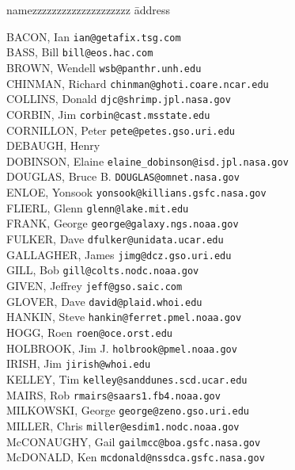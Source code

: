 \begin{latexonly}
\begin{tabbing}
namezzzzzzzzzzzzzzzzzzzz \= address \kill

BACON, Ian \> {\tt ian@getafix.tsg.com} \\
BASS, Bill \> {\tt bill@eos.hac.com} \\
BROWN, Wendell \> {\tt wsb@panthr.unh.edu} \\
CHINMAN, Richard \> {\tt chinman@ghoti.coare.ncar.edu} \\
COLLINS, Donald \> {\tt djc@shrimp.jpl.nasa.gov} \\
CORBIN, Jim \> {\tt corbin@cast.msstate.edu} \\
CORNILLON, Peter \> {\tt pete@petes.gso.uri.edu} \\
DEBAUGH, Henry \\
DOBINSON, Elaine \> {\tt elaine\_dobinson@isd.jpl.nasa.gov} \\
DOUGLAS, Bruce B.\> {\tt DOUGLAS@omnet.nasa.gov} \\
ENLOE, Yonsook \> {\tt yonsook@killians.gsfc.nasa.gov} \\
FLIERL, Glenn \> {\tt glenn@lake.mit.edu} \\
FRANK, George \> {\tt george@galaxy.ngs.noaa.gov} \\
FULKER, Dave \> {\tt dfulker@unidata.ucar.edu} \\
GALLAGHER, James \> {\tt jimg@dcz.gso.uri.edu} \\
GILL, Bob \> {\tt gill@colts.nodc.noaa.gov} \\
GIVEN, Jeffrey \> {\tt jeff@gso.saic.com} \\
GLOVER, Dave \> {\tt david@plaid.whoi.edu} \\
HANKIN, Steve \> {\tt hankin@ferret.pmel.noaa.gov} \\
HOGG, Roen \> {\tt roen@oce.orst.edu} \\
HOLBROOK, Jim J.\> {\tt holbrook@pmel.noaa.gov} \\
IRISH, Jim \> {\tt jirish@whoi.edu} \\
KELLEY, Tim \> {\tt kelley@sanddunes.scd.ucar.edu} \\
MAIRS, Rob \> {\tt rmairs@saars1.fb4.noaa.gov} \\
MILKOWSKI, George \> {\tt george@zeno.gso.uri.edu} \\
MILLER, Chris \> {\tt miller@esdim1.nodc.noaa.gov} \\
McCONAUGHY, Gail \> {\tt gailmcc@boa.gsfc.nasa.gov} \\
McDONALD, Ken \> {\tt mcdonald@nssdca.gsfc.nasa.gov} \\

\end{tabbing}
\end{latexonly}
